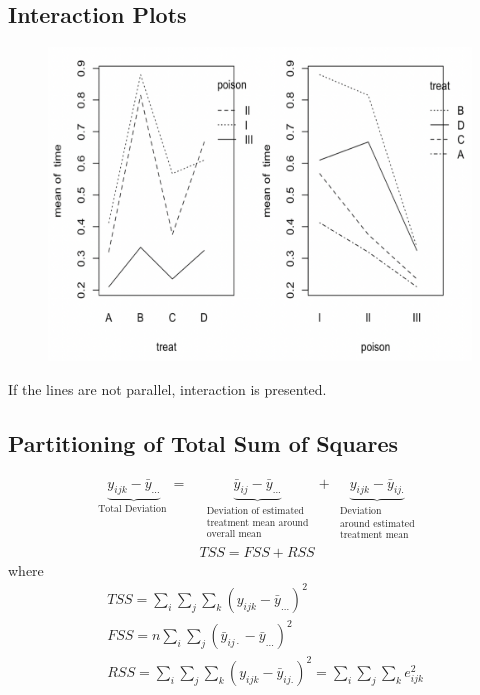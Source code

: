 \documentclass[11pt,a4paper]{article}
\begin{document}
\subsection{Interaction Plots}
\begin{center}\begin{figure}[htbp]
    \centering
    \includegraphics[scale=0.5]{IP}
    \caption{}
    \label{}
\end{figure}\end{center}
If the lines are not parallel, interaction is presented.

\subsection{Partitioning of Total Sum of Squares}
$$\begin{aligned} \underbrace{y_{i j k}-\bar{y}_{...}}_{\text {Total Deviation }}=& \underbrace{\bar{y}_{i j}-\bar{y} _{...}}_{\begin{array}{c}\text { Deviation of estimated } \\ \text { treatment mean around } \\ \text { overall mean }\end{array}}+\underbrace{y_{i j k}-\bar{y}_{i j.}}_{\begin{array}{c}\text { Deviation } \\ \text { around estimated } \\ \text { treatment mean }\end{array}} \\ & T S S=F S S+R S S \end{aligned}$$
where
$$
\begin{aligned}
&T S S=\sum_{i} \sum_{j} \sum_{k}\left(y_{i j k}-\bar{y} _{...}\right)^{2} \\
&F S S=n \sum_{i} \sum_{j}\left(\bar{y}_{i j \cdot}-\bar{y} _{...}\right)^{2} \\
&R S S=\sum_{i} \sum_{j} \sum_{k}\left(y_{i j k}-\bar{y}_{i j.}\right)^{2}=\sum_{i} \sum_{j} \sum_{k} e_{i j k}^{2}
\end{aligned}
$$
\end{document}
